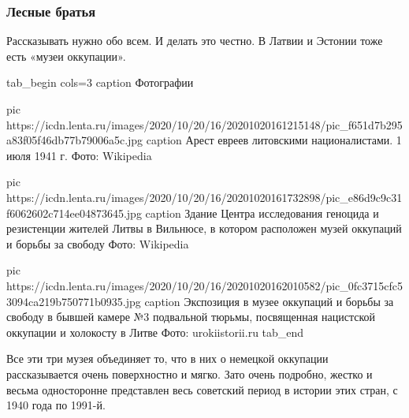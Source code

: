  
 
 
 
 
\subsubsection{Лесные братья}
\label{sec:02_12_2020.news.ru.lenta_ru.mozzhuhin_andrei.1.pribaltika.lesnyje_bratja}


Рассказывать нужно обо всем. И делать это честно. В Латвии и Эстонии тоже есть
«музеи оккупации».

\ifcmt
tab_begin cols=3
	caption Фотографии 

	pic https://icdn.lenta.ru/images/2020/10/20/16/20201020161215148/pic_f651d7b295a83f05f46db77b79006a5c.jpg
	caption Арест евреев литовскими националистами. 1 июля 1941 г.  Фото: Wikipedia

	pic https://icdn.lenta.ru/images/2020/10/20/16/20201020161732898/pic_e86d9c9c31f6062602c714ee04873645.jpg
	caption Здание Центра исследования геноцида и резистенции жителей Литвы в Вильнюсе, в котором расположен музей оккупаций и борьбы за свободу Фото: Wikipedia

	pic https://icdn.lenta.ru/images/2020/10/20/16/20201020162010582/pic_0fc3715cfc53094ca219b750771b0935.jpg
	caption Экспозиция в музее оккупаций и борьбы за свободу в бывшей камере №3 подвальной тюрьмы, посвященная нацистской оккупации и холокосту в Литве Фото: urokiistorii.ru
tab_end
\fi

Все эти три музея объединяет то, что в них о немецкой оккупации рассказывается
очень поверхностно и мягко. Зато очень подробно, жестко и весьма односторонне
представлен весь советский период в истории этих стран, с 1940 года по 1991-й.

